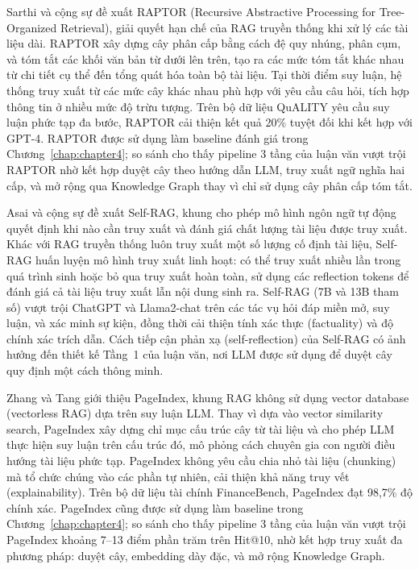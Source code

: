 Sarthi và cộng sự \cite{sarthi2024raptor} đề xuất RAPTOR (Recursive Abstractive
Processing for Tree-Organized Retrieval), giải quyết hạn chế của RAG truyền thống
khi xử lý các tài liệu dài. RAPTOR xây dựng cây phân cấp bằng cách đệ quy nhúng,
phân cụm, và tóm tắt các khối văn bản từ dưới lên trên, tạo ra các mức tóm tắt
khác nhau từ chi tiết cụ thể đến tổng quát hóa toàn bộ tài liệu. Tại thời điểm
suy luận, hệ thống truy xuất từ các mức cây khác nhau phù hợp với yêu cầu câu hỏi,
tích hợp thông tin ở nhiều mức độ trừu tượng. Trên bộ dữ liệu QuALITY yêu cầu suy
luận phức tạp đa bước, RAPTOR cải thiện kết quả 20\% tuyệt đối khi kết hợp với
GPT-4. RAPTOR được sử dụng làm baseline đánh giá trong Chương~\ref{chap:chapter4};
so sánh cho thấy pipeline 3 tầng của luận văn vượt trội RAPTOR nhờ kết hợp duyệt
cây theo hướng dẫn LLM, truy xuất ngữ nghĩa hai cấp, và mở rộng qua Knowledge
Graph thay vì chỉ sử dụng cây phân cấp tóm tắt.

Asai và cộng sự \cite{asai2024selfrag} đề xuất Self-RAG, khung cho phép mô hình
ngôn ngữ tự động quyết định khi nào cần truy xuất và đánh giá chất lượng tài liệu
được truy xuất. Khác với RAG truyền thống luôn truy xuất một số lượng cố định tài
liệu, Self-RAG huấn luyện mô hình truy xuất linh hoạt: có thể truy xuất nhiều lần
trong quá trình sinh hoặc bỏ qua truy xuất hoàn toàn, sử dụng các reflection tokens
để đánh giá cả tài liệu truy xuất lẫn nội dung sinh ra. Self-RAG (7B và 13B tham
số) vượt trội ChatGPT và Llama2-chat trên các tác vụ hỏi đáp miền mở, suy luận,
và xác minh sự kiện, đồng thời cải thiện tính xác thực (factuality) và độ chính xác
trích dẫn. Cách tiếp cận phản xạ (self-reflection) của Self-RAG có ảnh hưởng đến
thiết kế Tầng~1 của luận văn, nơi LLM được sử dụng để duyệt cây quy định một cách
thông minh.

Zhang và Tang \cite{zhang2025pageindex} giới thiệu PageIndex, khung RAG không sử
dụng vector database (vectorless RAG) dựa trên suy luận LLM. Thay vì dựa vào vector
similarity search, PageIndex xây dựng chỉ mục cấu trúc cây từ tài liệu và cho phép
LLM thực hiện suy luận trên cấu trúc đó, mô phỏng cách chuyên gia con người điều
hướng tài liệu phức tạp. PageIndex không yêu cầu chia nhỏ tài liệu (chunking) mà
tổ chức chúng vào các phần tự nhiên, cải thiện khả năng truy vết (explainability).
Trên bộ dữ liệu tài chính FinanceBench, PageIndex đạt 98,7\% độ chính xác. PageIndex
cũng được sử dụng làm baseline trong Chương~\ref{chap:chapter4}; so sánh cho thấy
pipeline 3 tầng của luận văn vượt trội PageIndex khoảng 7--13 điểm phần trăm trên
Hit@10, nhờ kết hợp truy xuất đa phương pháp: duyệt cây, embedding dày đặc, và mở
rộng Knowledge Graph.

